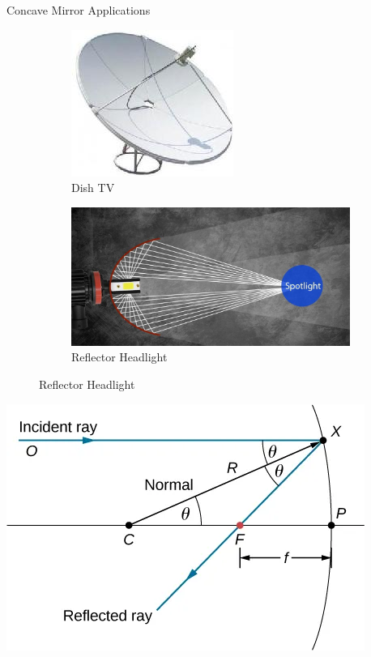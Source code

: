 \documentclass{beamer}
\begin{document}
\begin{frame}{Concave Mirror Applications}
\begin{figure}
\begin{subfigure}[b]{0.3\textwidth}
			\includegraphics[width=\textwidth]{45.jpeg}
			\caption{Dish TV}
			\label{Bending Direction}
		\end{subfigure}
		\hfill
		\begin{subfigure}[b]{0.3\textwidth}
			\centering
			\includegraphics[width=\textwidth]{47.jpeg}
			\caption{Reflector Headlight}
			\label{Bending Direction}
		\end{subfigure}
	\end{figure}
\end{frame}
\begin{frame}
	\begin{center}
		\includegraphics[scale=0.3]{50.png}
	\end{center}
\end{frame}
\end{document}
